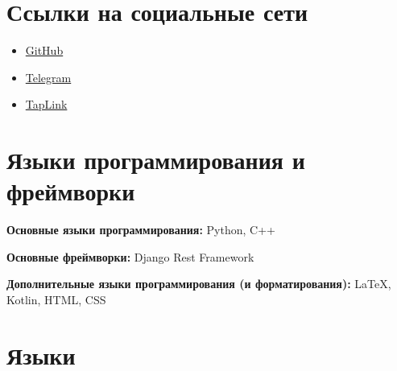 \documentclass[11pt]{article}
\begin{document}
    \vspace{2 mm}

    \begin{minipage}{\textwidth}
        \section*{Ссылки на социальные сети}
        \begin{itemize}
            \item \href{https://github.com/EvgenyBaulin}{GitHub}
            \item \href{https://t.me/tarakan_tuc}{Telegram}
            \item \href{https://taplink.cc/evgenbaulin}{TapLink}
        \end{itemize}
    \end{minipage}

    \vspace{2 mm}

    \begin{minipage}{\textwidth}
        \section*{Языки программирования и фреймворки}
        \textbf{Основные языки программирования:} Python, C++

        \textbf{Основные фреймворки:} Django Rest Framework

        \textbf{Дополнительные языки программирования (и форматирования):} LaTeX, Kotlin, HTML, CSS

    \end{minipage}

    \vspace{2 mm}

    \begin{minipage}{0.9\textwidth}
        \section*{Языки}
    \end{minipage}

    \vspace{2 mm}

    \begin{minipage}{0.9\textwidth}

    \end{minipage}
\end{document}
